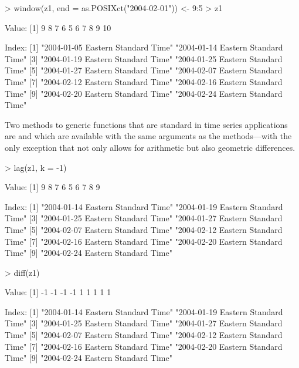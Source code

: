 \documentclass{Z}
\begin{document}
\begin{Schunk}
\begin{Sinput}
> window(z1, end = as.POSIXct("2004-02-01")) <- 9:5
> z1
\end{Sinput}
\begin{Soutput}
Value:
 [1]  9  8  7  6  5  6  7  8  9 10

Index:
 [1] "2004-01-05 Eastern Standard Time" "2004-01-14 Eastern Standard Time"
 [3] "2004-01-19 Eastern Standard Time" "2004-01-25 Eastern Standard Time"
 [5] "2004-01-27 Eastern Standard Time" "2004-02-07 Eastern Standard Time"
 [7] "2004-02-12 Eastern Standard Time" "2004-02-16 Eastern Standard Time"
 [9] "2004-02-20 Eastern Standard Time" "2004-02-24 Eastern Standard Time"
\end{Soutput}
\end{Schunk}

Two methods to generic functions that are standard in time series applications
are  and  which are available with the same
arguments as the  methods---with the only exception that 
not only allows for arithmetic but also geometric differences.
\begin{Schunk}
\begin{Sinput}
> lag(z1, k = -1)
\end{Sinput}
\begin{Soutput}
Value:
[1] 9 8 7 6 5 6 7 8 9

Index:
[1] "2004-01-14 Eastern Standard Time" "2004-01-19 Eastern Standard Time"
[3] "2004-01-25 Eastern Standard Time" "2004-01-27 Eastern Standard Time"
[5] "2004-02-07 Eastern Standard Time" "2004-02-12 Eastern Standard Time"
[7] "2004-02-16 Eastern Standard Time" "2004-02-20 Eastern Standard Time"
[9] "2004-02-24 Eastern Standard Time"
\end{Soutput}
\begin{Sinput}
> diff(z1)
\end{Sinput}
\begin{Soutput}
Value:
[1] -1 -1 -1 -1  1  1  1  1  1

Index:
[1] "2004-01-14 Eastern Standard Time" "2004-01-19 Eastern Standard Time"
[3] "2004-01-25 Eastern Standard Time" "2004-01-27 Eastern Standard Time"
[5] "2004-02-07 Eastern Standard Time" "2004-02-12 Eastern Standard Time"
[7] "2004-02-16 Eastern Standard Time" "2004-02-20 Eastern Standard Time"
[9] "2004-02-24 Eastern Standard Time"
\end{Soutput}
\end{Schunk}
\end{document}
